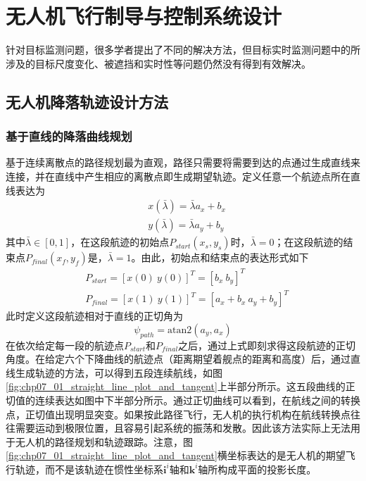 \chapter{无人机飞行制导与控制系统设计}
针对目标监测问题，很多学者提出了不同的解决方法，但目标实时监测问题中的所涉及的目标尺度变化、被遮挡和实时性等问题仍然没有得到有效解决。

\section{无人机降落轨迹设计方法}

\subsection{基于直线的降落曲线规划}
基于连续离散点的路径规划最为直观，路径只需要将需要到达的点通过生成直线来连接，并在直线中产生相应的离散点即生成期望轨迹。定义任意一个航迹点所在直线表达为
\begin{align}
&x(\bar{\lambda}) =\bar{\lambda} a_x + b_x \\
&y(\bar{\lambda}) =  \bar{\lambda} a_y +b_y
\end{align}
其中$\bar{\lambda} \in [0, 1]$，在这段航迹的初始点$P_{start}(x_s, y_s)$时，$\bar{\lambda} = 0$；在这段航迹的结束点$P_{final}(x_f,y_f)$是，$\bar{\lambda} = 1$。由此，初始点和结束点的表达形式如下
\begin{align}
&P_{start} = [x(0)\ y(0)]^T=[b_x\ b_y]^T \\
&P_{final} = [x(1)\ y(1)]^T=[a_x+b_x\ a_y+b_y]^T
\end{align}
此时定义这段航迹相对于直线的正切角为
\begin{equation}
\psi_{path}=\text{atan2}(a_y, a_x)
\end{equation}
在依次给定每一段的航迹点$P_{start}$和$P_{final}$之后，通过上式即刻求得这段航迹的正切角度。在给定六个下降曲线的航迹点（距离期望着舰点的距离和高度）后，通过直线生成轨迹的方法，可以得到五段连续航线，如图\ref{fig:chp07_01_straight_line_plot_and_tangent}上半部分所示。这五段曲线的正切值的连续表达如图中下半部分所示。通过正切曲线可以看到，在航线之间的转换点，正切值出现明显突变。如果按此路径飞行，无人机的执行机构在航线转换点往往需要运动到极限位置，且容易引起系统的振荡和发散。因此该方法实际上无法用于无人机的路径规划和轨迹跟踪。注意，图\ref{fig:chp07_01_straight_line_plot_and_tangent}横坐标表达的是无人机的期望飞行轨迹，而不是该轨迹在惯性坐标系$\mathbf{i}^{i}$轴和$\mathbf{k}^{i}$轴所构成平面的投影长度。

